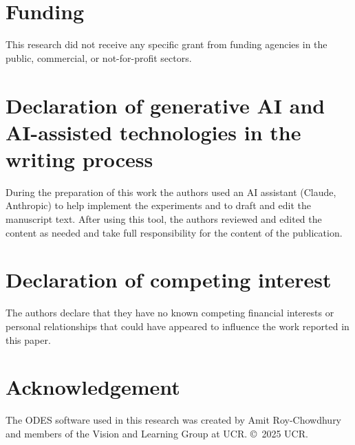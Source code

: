 \documentclass[a4paper,fleqn]{cas-dc}
\begin{document}
\section*{Funding}
This research did not receive any specific grant from funding agencies in the public, commercial, or not-for-profit sectors.

\section*{Declaration of generative AI and AI-assisted technologies in the writing process}
During the preparation of this work the authors used an AI assistant (Claude, Anthropic) to help implement the experiments and to draft and edit the manuscript text. After using this tool, the authors reviewed and edited the content as needed and take full responsibility for the content of the publication.

\section*{Declaration of competing interest}
The authors declare that they have no known competing financial interests or personal relationships that could have appeared to influence the work reported in this paper.

\section*{Acknowledgement}
The ODES software used in this research was created by Amit Roy-Chowdhury and members of the Vision and Learning Group at UCR. \copyright\ 2025 UCR.

\clearpage
\renewcommand{\bibfont}{\scriptsize}
\setlength{\bibsep}{1pt}


\end{document}
